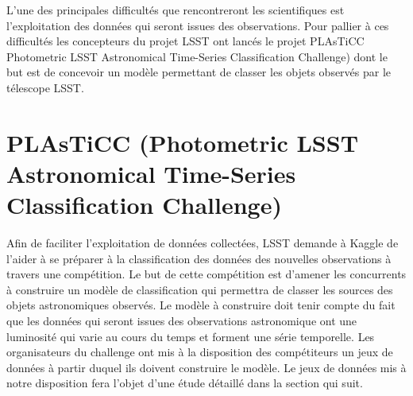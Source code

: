 L’une des principales difficultés que rencontreront les scientifiques est l’exploitation des données qui seront issues des observations.
Pour pallier à ces difficultés les concepteurs du projet LSST ont lancés le projet PLAsTiCC  Photometric LSST Astronomical Time-Series Classification Challenge) dont le but est de concevoir un modèle permettant de classer les objets observés par le télescope LSST.

\section{PLAsTiCC  (Photometric LSST Astronomical Time-Series Classification Challenge)}
Afin de faciliter l’exploitation de données collectées, LSST demande à Kaggle de l’aider à se préparer à la classification des données des nouvelles observations à travers une compétition. 
Le but de cette compétition est d’amener les concurrents  à construire un modèle de  classification qui permettra de classer  les sources  des objets astronomiques observés. 
Le modèle à construire doit tenir compte du fait que les données qui seront issues des observations astronomique ont une luminosité qui varie au cours du temps et forment une série temporelle.
Les organisateurs du challenge ont mis à la disposition des compétiteurs un jeux de données à partir duquel ils doivent construire le modèle.
Le jeux de données mis à notre disposition fera l’objet d’une étude détaillé dans la section qui suit.

